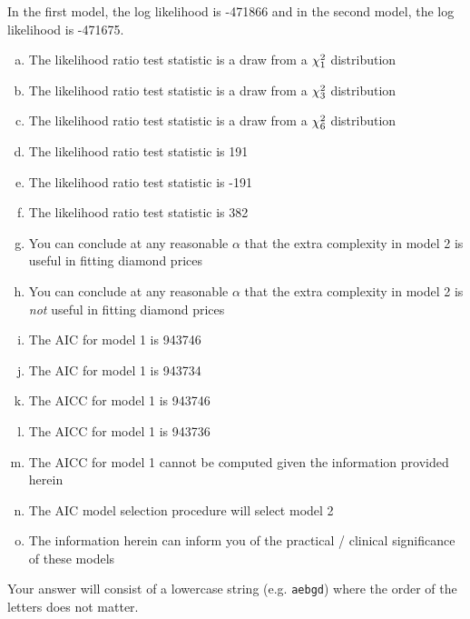 \documentclass[12pt,landscape]{article}
\newcommand{\instr}{\small Your answer will consist of a lowercase string (e.g. \texttt{aebgd}) where the order of the letters does not matter. \normalsize}
\begin{document}

\problem{} 

\noindent In the first model, the log likelihood is -471866 and in the second model, the log likelihood is -471675.

\vspace{-0.2cm}\benum{} 

\begin{enumerate}[(a)]
\item The likelihood ratio test statistic is a draw from a $\chi^2_{1}$ distribution
\item The likelihood ratio test statistic is a draw from a $\chi^2_{3}$ distribution
\item The likelihood ratio test statistic is a draw from a $\chi^2_{6}$ distribution
\item The likelihood ratio test statistic is 191
\item The likelihood ratio test statistic is -191
\item The likelihood ratio test statistic is 382
\item You can conclude at any reasonable $\alpha$ that the extra complexity in model 2 is useful in fitting diamond prices
\item You can conclude at any reasonable $\alpha$ that the extra complexity in model 2 is \emph{not} useful in fitting diamond prices
\item The AIC for model 1 is 943746
\item The AIC for model 1 is 943734
\item The AICC for model 1 is 943746
\item The AICC for model 1 is 943736
\item The AICC for model 1 cannot be computed given the information provided herein
\item The AIC model selection procedure will select model 2
\item The information herein can inform you of the practical / clinical significance of these models
\end{enumerate}
\eenum\instr\pagebreak
\end{document}

